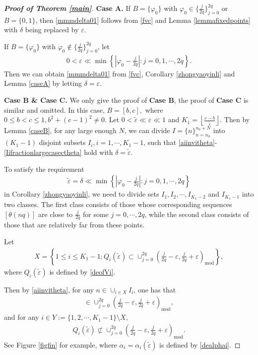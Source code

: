 \documentclass[12pt]{amsart}
\newcommand{\abs}[1]{\left\lvert #1 \right\rvert}
\theoremstyle{plain}
\theoremstyle{definition}
\begin{document}
\begin{proof}[\textbf{Proof of Theorem \ref{main}}]
 \textbf{Case A.}
		If $B=\{\varphi_0\}$ with $\varphi_0\in \{\frac{j}{2q}\}_{j=0}^{2q}$ or $B=\{0,1\}$, then \eqref{mmmdelta01} follows from \eqref{fvc} and Lemma \ref{lemmafixedpoints} with $\delta$ being replaced by $\varepsilon$.
		
	If $B=\{\varphi_0\}$ with $\varphi_0\notin \{\frac{j}{2q}\}_{j=0}^{2q}$, 
	let 
		\begin{align}
		0<\varepsilon\ll \min\left\{\abs{\varphi_0-\frac{j}{2q}}:j=0,1,\cdots,2q\right\}.\nonumber
	\end{align} 
	Then we can obtain
	\eqref{mmmdelta01} from \eqref{fvc}, Corollary \ref{zhongyaoyinli} and Lemma \ref{caseA} by letting $\delta=\varepsilon$.
	
 \textbf{Case B \& Case C.} We only give the proof of \textbf{Case B}, the proof of \textbf{Case C} is similar and omitted.
In this case, $B=[b,c],$ where $0\leq b<c\leq 1, b^2+(c-1)^2\neq 0$. Let $0<\tilde{\varepsilon}\ll\varepsilon\ll1$ and $K_1=\left \lfloor \frac{c-b}{\tilde{\varepsilon}} \right \rfloor$. Then by Lemma \ref{caseB}, for any large enough $N$, we can divide $I=\{n\}_{n=n_0}^{n_0+N}$ into $(K_1-1)$ disjoint subsets $I_i,i=1,\cdots,K_1-1$, such that \eqref{aiinvitheta}-\eqref{Iifractionlargecasectheta} hold with $\delta=\tilde{\varepsilon}$. 

To satisfy the requirement 
	\begin{align}
	\tilde{\varepsilon}=\delta\ll \min\left\{\abs{\varphi_0-\frac{j}{2q}}:j=0,1,\cdots,2q\right\}\label{vedllm}
\end{align} 
in Corollary \ref{zhongyaoyinli}, we need to divide sets $I_1,I_2,\cdots,I_{K_1-2}$ and $I_{K_1-1}$ into two classes. 
The first class consists of those whose corresponding sequences $[\theta(nq)]$ are close to 
$\frac{j}{2q}$ for some $j=0,\cdots,2q$, while the second class consists of those that are relatively far from these points. 


Let
\begin{align}
	X=\left\{1\leq i\leq K_1-1: Q_i(\tilde{\varepsilon})\subset\cup_{j=0}^{2q} \left(\frac{j}{2q}-\varepsilon,\frac{j}{2q}+\varepsilon\right)_{\mathrm{mod}}\right\},\nonumber
\end{align}
where $Q_i(\tilde{\varepsilon})$ is defined by \eqref{deofVi}.


Then by \eqref{aiinvitheta}, for any $n\in \cup_{i\in X} I_i$, one has that 
\begin{align}
	[\theta(nq)]\in \cup_{j=0}^{2q}{\left(\frac{j}{2q}-\varepsilon,\frac{j}{2q}+\varepsilon\right)_{\mathrm{mod}}},\label{fiqix}
\end{align}
and for any $i\in Y:=\{1,2,\cdots,K_1-1\}\setminus X$,  
\begin{align}
	Q_i(\tilde{\varepsilon}) \not\subset\cup_{j=0}^{2q} \left(\frac{j}{2q}-\varepsilon,\frac{j}{2q}+\varepsilon\right)_{\mathrm{mod}}.\label{fiqite}
\end{align}
See Figure \ref{figfin} for example, where $\alpha_i=\alpha_i(\tilde{\varepsilon})$ is defined by \eqref{dealphai}.


\end{proof}
\end{document}
